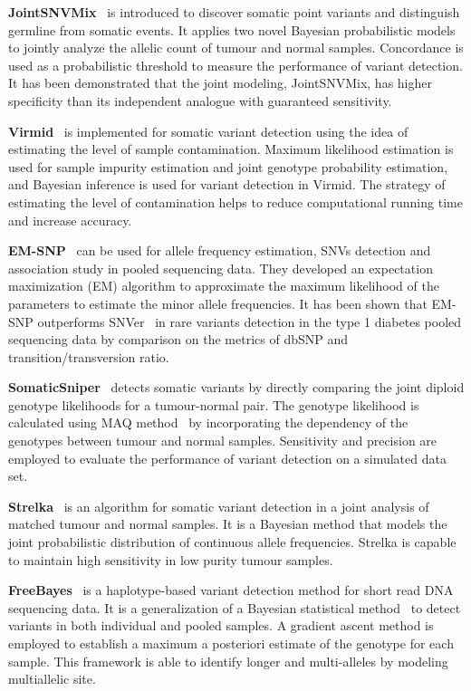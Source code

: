 \documentclass[a4,center,fleqn]{NAR}
\begin{document}
\textbf{JointSNVMix}~\citep{Roth2012} is introduced to discover somatic point variants and distinguish germline from somatic events.
It applies two novel Bayesian probabilistic models to jointly analyze the allelic count of tumour and normal samples.
Concordance is used as a probabilistic threshold to measure the performance of variant detection.
It has been demonstrated that the joint modeling, JointSNVMix, has higher specificity than its independent analogue with guaranteed sensitivity.

\textbf{Virmid}~\citep{Kim2013} is implemented for somatic variant detection using the idea of estimating the level of sample contamination.
Maximum likelihood estimation is used for sample impurity estimation and joint genotype probability estimation, and Bayesian inference is used for variant detection in Virmid.
The strategy of estimating the level of contamination helps to reduce computational running time and increase accuracy.

\textbf{EM-SNP}~\citep{Chen2013} can be used for allele frequency estimation, SNVs detection and association study in pooled sequencing data.
They developed an expectation maximization (EM) algorithm to approximate the maximum likelihood of the parameters to estimate the minor allele frequencies.
It has been shown that EM-SNP outperforms SNVer~\citep{Wei2011} in rare variants detection in the type 1 diabetes pooled sequencing data by comparison on the metrics of dbSNP and transition/transversion ratio.

\textbf{SomaticSniper}~\citep{Larson2012} detects somatic variants by directly comparing the joint diploid genotype likelihoods for a tumour-normal pair.
The genotype likelihood is calculated using MAQ method~\citep{Li2008} by incorporating the dependency of the genotypes between tumour and normal samples.
Sensitivity and precision are employed to evaluate the performance of variant detection on a simulated data set.

\textbf{Strelka}~\citep{Saunders2012} is an algorithm for somatic variant detection in a joint analysis of matched tumour and normal samples.
It is a Bayesian method that models the joint probabilistic distribution of continuous allele frequencies.
Strelka is capable to maintain high sensitivity in low purity tumour samples.

\textbf{FreeBayes}~\citep{Garrison2012} is a haplotype-based variant detection method for short read DNA sequencing data.
It is a generalization of a Bayesian statistical method~\citep{marth1999general} to detect variants in both individual and pooled samples.
A gradient ascent method is employed to establish a maximum a posteriori estimate of the genotype for each sample.
This framework is able to identify longer and multi-alleles by modeling multiallelic site.
\end{document}
